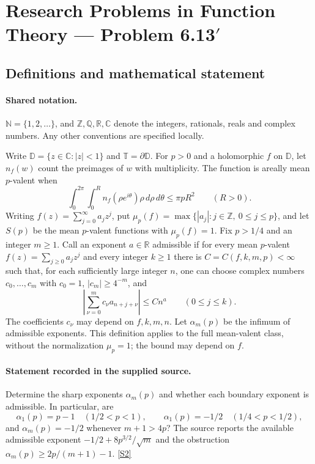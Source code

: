 \documentclass[11pt]{article}
\newcommand{\sref}[2]{\hyperlink{source:#1:#2}{[S#2]}}
\begin{document}
\section{Research Problems in Function Theory — Problem 6.13$\prime$}\label{statement}

\subsection{Definitions and mathematical statement}

\paragraph{Shared notation.}$\mathbb N=\{1,2,\ldots\}$, and $\mathbb Z,\mathbb Q,\mathbb R,\mathbb C$ denote the integers, rationals, reals and complex numbers. Any other conventions are specified locally.


Write $\mathbb D=\{z\in\mathbb C:|z|<1\}$ and $\mathbb T=\partial\mathbb D$. For $p>0$ and a holomorphic $f$ on $\mathbb D$, let $n_f(w)$ count the preimages of $w$ with multiplicity. The function is areally mean $p$-valent when
\[\int_0^{2\pi}\int_0^R n_f(\rho e^{i\theta})\rho\,d\rho\,d\theta\leq\pi pR^2\qquad(R>0).\]
Writing $f(z)=\sum_{j=0}^{\infty}a_jz^j$, put $\mu_p(f)=\max\{|a_j|:j\in\mathbb Z,\ 0\leq j\leq p\}$, and let $S(p)$ be the mean $p$-valent functions with $\mu_p(f)=1$.
Fix $p>1/4$ and an integer $m\geq1$. Call an exponent $a\in\mathbb R$ admissible if for every mean $p$-valent $f(z)=\sum_{j\geq0}a_jz^j$ and every integer $k\geq1$ there is $C=C(f,k,m,p)<\infty$ such that, for each sufficiently large integer $n$, one can choose complex numbers $c_0,\ldots,c_m$ with $c_0=1$, $|c_m|\geq4^{-m}$, and
\[\left|\sum_{\nu=0}^{m}c_\nu a_{n+j+\nu}\right|\leq Cn^a\qquad(0\leq j\leq k).\]
The coefficients $c_\nu$ may depend on $f,k,m,n$. Let $\alpha_m(p)$ be the infimum of admissible exponents. This definition applies to the full mean-valent class, without the normalization $\mu_p=1$; the bound may depend on $f$.
\paragraph{Statement recorded in the supplied source.}
Determine the sharp exponents $\alpha_m(p)$ and whether each boundary exponent is admissible. In particular, are
\[\alpha_1(p)=p-1\quad(1/2<p<1),\qquad
\alpha_1(p)=-1/2\quad(1/4<p<1/2),\]
and $\alpha_m(p)=-1/2$ whenever $m+1>4p$? The source reports the available admissible exponent $-1/2+8p^{3/2}/\sqrt m$ and the obstruction $\alpha_m(p)\geq2p/(m+1)-1$. \sref{statement}{2}
\end{document}
